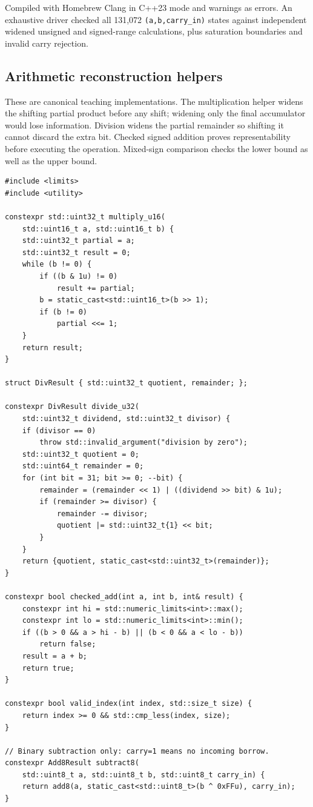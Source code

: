 \hypertarget{appendix-4e2236f53445-verification-1}{}

Compiled with Homebrew Clang in C++23 mode and warnings as errors. An exhaustive driver checked all 131,072 \texttt{(a,b,carry\_in)} states against independent widened unsigned and signed-range calculations, plus saturation boundaries and invalid carry rejection.

\subsection{Arithmetic reconstruction helpers}\label{appendix-4e2236f53445-arithmetic-reconstruction-helpers}

\hypertarget{appendix-4e2236f53445-arithmetic-reconstruction-helpers}{}

These are canonical teaching implementations. The multiplication helper widens the shifting partial product before any shift; widening only the final accumulator would lose information. Division widens the partial remainder so shifting it cannot discard the extra bit. Checked signed addition proves representability before executing the operation. Mixed-sign comparison checks the lower bound as well as the upper bound.

\begin{verbatim}
#include <limits>
#include <utility>

constexpr std::uint32_t multiply_u16(
    std::uint16_t a, std::uint16_t b) {
    std::uint32_t partial = a;
    std::uint32_t result = 0;
    while (b != 0) {
        if ((b & 1u) != 0)
            result += partial;
        b = static_cast<std::uint16_t>(b >> 1);
        if (b != 0)
            partial <<= 1;
    }
    return result;
}

struct DivResult { std::uint32_t quotient, remainder; };

constexpr DivResult divide_u32(
    std::uint32_t dividend, std::uint32_t divisor) {
    if (divisor == 0)
        throw std::invalid_argument("division by zero");
    std::uint32_t quotient = 0;
    std::uint64_t remainder = 0;
    for (int bit = 31; bit >= 0; --bit) {
        remainder = (remainder << 1) | ((dividend >> bit) & 1u);
        if (remainder >= divisor) {
            remainder -= divisor;
            quotient |= std::uint32_t{1} << bit;
        }
    }
    return {quotient, static_cast<std::uint32_t>(remainder)};
}

constexpr bool checked_add(int a, int b, int& result) {
    constexpr int hi = std::numeric_limits<int>::max();
    constexpr int lo = std::numeric_limits<int>::min();
    if ((b > 0 && a > hi - b) || (b < 0 && a < lo - b))
        return false;
    result = a + b;
    return true;
}

constexpr bool valid_index(int index, std::size_t size) {
    return index >= 0 && std::cmp_less(index, size);
}

// Binary subtraction only: carry=1 means no incoming borrow.
constexpr Add8Result subtract8(
    std::uint8_t a, std::uint8_t b, std::uint8_t carry_in) {
    return add8(a, static_cast<std::uint8_t>(b ^ 0xFFu), carry_in);
}
\end{verbatim}

